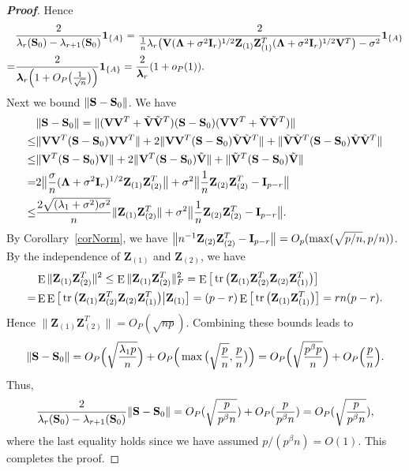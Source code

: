 \documentclass[3p]{elsarticle}
\DeclareMathOperator{\mytr}{tr}
\DeclareMathOperator{\myE}{E}
\newcommand{\bZ}{\mathbf{Z}}
\newcommand{\bfsym}[1]{\ensuremath{\boldsymbol{#1}}}
\def\blambda {\bfsym {\lambda}}        \def\bLambda {\bfsym {\Lambda}}
\theoremstyle{plain}
\theoremstyle{definition}
\theoremstyle{remark}
\begin{document}
\begin{appendices}
\begin{proof}[\textbf{Proof}]
        Hence
$$
\begin{aligned}
    &\frac{2}{\lambda_r(\BS_0)-\lambda_{r+1}(\BS_0)}\mathbf{1}_{\{A\}}
    =
    \frac{2}{
        \frac{1}{n}\lambda_r\big(\BV(\bLambda+\sigma^2 \BI_r)^{1/2}\bZ_{(1)} \bZ_{(1)}^T(\bLambda+\sigma^2 \BI_r)^{1/2}\BV^T\big)-\sigma^2}\mathbf{1}_{\{A\}}\\
    =&\frac{2}{\blambda_r\Big(1+O_P\big(\frac{1}{\sqrt{n}}\big)\Big)}\mathbf{1}_{\{A\}}
    =\frac{2}{\blambda_r}(1+o_P(1)).
\end{aligned}
    $$
    Next we bound $\|\mathbf{S}-\mathbf{S}_0\|$. 
    We have
    $$
    \begin{aligned}
        &\|\BS-\BS_0\|=
        \|(\BV\BV^T+\tilde{\BV}\tilde{\BV}^T)(\BS-\BS_0)(\BV\BV^T+\tilde{\BV}\tilde{\BV}^T)\|\\
        \leq& \|\BV\BV^T (\BS-\BS_0) \BV\BV^T\|+2 \|\BV\BV^T (\BS-\BS_0) \tilde{\BV}\tilde{\BV}^T\|+\|\tilde{\BV}\tilde{\BV}^T (\BS-\BS_0) \tilde{\BV}\tilde{\BV}^T\|\\
        \leq& \|\BV^T (\BS-\BS_0) \BV\|+2 \|\BV^T (\BS-\BS_0) \tilde{\BV}\|+\|\tilde{\BV}^T (\BS-\BS_0) \tilde{\BV}\|\\
        = &
        2\big\|\frac{\sigma}{n}(\bLambda+\sigma^2 \BI_r)^{1/2}\bZ_{(1)} \bZ_{(2)}^T\big\|+
        \sigma^2\big\|\frac{1}{n}\bZ_{(2)} \bZ_{(2)}^T- \BI_{p-r}\big\|\\
        \leq & \frac{2\sqrt{(\lambda_1+\sigma^2)\sigma^2}}{n}\|\bZ_{(1)}\bZ_{(2)}^T\|+
        \sigma^2\big\|\frac{1}{n}\bZ_{(2)} \bZ_{(2)}^T- \BI_{p-r}\big\|.
    \end{aligned}
    $$
    By Corollary~\ref{corNorm}, we have $\big\|n^{-1}\bZ_{(2)} \bZ_{(2)}^T- \BI_{p-r}\big\|=O_p(\max(\sqrt{p/n},p/n))$.
    By the independence of $\bZ_{(1)}$ and $\bZ_{(2)}$, we have
    $$
    \begin{aligned}
        &\myE \|\bZ_{(1)}\bZ_{(2)}^T\|^2\leq
    \myE \|\bZ_{(1)}\bZ_{(2)}^T\|_F^2
    =
    \myE \big[ \mytr\big(\bZ_{(1)}\bZ_{(2)}^T\bZ_{(2)}\bZ_{(1)}^T\big) \big]\\
        =&
        \myE\myE \big[ \mytr\big(\bZ_{(1)}\bZ_{(2)}^T\bZ_{(2)}\bZ_{(1)}^T\big)\big|\BZ_{(1)} \big]
        =(p-r)
    \myE \big[ \mytr\big(\bZ_{(1)}\bZ_{(1)}^T\big) \big]
        =rn(p-r).
    \end{aligned}
    $$
    Hence $\|\bZ_{(1)}\bZ_{(2)}^T\|=O_P(\sqrt{np})$.
    Combining these bounds leads to
    $$
    \|\mathbf{S}-\mathbf{S}_0\|=
 O_P\Big(\sqrt{\frac{\lambda_1 p}{n}}\Big)+O_P\Big(\max\big(\sqrt{\frac{p}{n}},\frac{p}{n}\big)\Big)
    =
    O_P\Big(\sqrt{\frac{ p^{\beta}p}{n}}\Big)+O_P\Big(\frac{p}{n}\Big).
    $$
    Thus,
    $$
   \frac{2}{\lambda_r(\mathbf{S}_0)-\lambda_{r+1}(\mathbf{S}_0)}\|\mathbf{S}-\mathbf{S}_0\|=
    O_P(\sqrt{\frac{p}{p^{\beta}n}})+O_P(\frac{p}{p^{\beta}n})=
O_P(\sqrt{\frac{p}{p^{\beta}n}}),
    $$
    where the last equality holds since we have assumed $p/(p^{\beta}n)=O(1)$.
    This completes the proof.


\end{proof}
\end{appendices}
\end{document}
